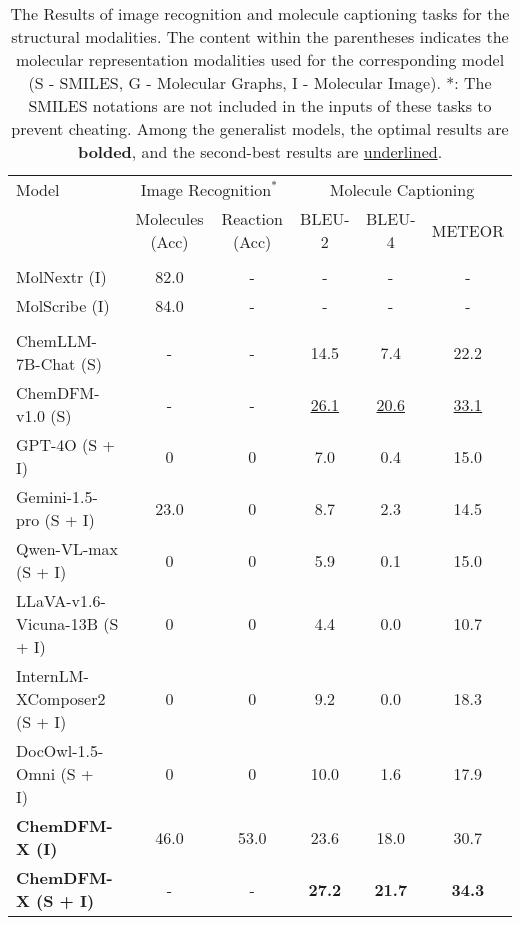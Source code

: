 \begin{table*}
    \centering
    \setlength\tabcolsep{5pt}
    \begin{tabular}{lccccc}
    \toprule
    \multirow{2.1}{*}{Model} & \multicolumn{2}{c}{$\text{Image Recognition}^*$} & \multicolumn{3}{c}{Molecule Captioning} \\
    \cmidrule(rl){2-3}  \cmidrule(rl){4-6} 
    & \small{Molecules (Acc)} & \small{Reaction (Acc)} & \small{BLEU-2} & \small{BLEU-4} & \small{METEOR} \\
    \midrule
    \rowcolor{grey}\multicolumn{6}{c}{\textit{specialist models}} \\
    MolNextr (I)~\cite{chen2024molnextr} & 82.0 & -& -& -& -\\ 
    MolScribe (I)~\cite{qian2023molscribe} & 84.0 & -& -& -& -\\
    \midrule
    \rowcolor{grey}\multicolumn{6}{c}{\textit{generalist models}} \\
    ChemLLM-7B-Chat (S)~\cite{zhang2024chemllm} & - & - & 14.5 & 7.4 & 22.2 \\
    ChemDFM-v1.0 (S)~\cite{zhao2024chemdfm} & - & - & \underline{26.1} & \underline{20.6} & \underline{33.1} \\
    GPT-4O (S + I)~\cite{gpt-4v} & 0 & 0 & 7.0 & 0.4 & 15.0 \\
    Gemini-1.5-pro (S + I)~\cite{gemini} & 23.0 & 0 & 8.7 & 2.3 & 14.5 \\
    Qwen-VL-max (S + I)~\cite{qwenvl} & 0 & 0 & 5.9 & 0.1 & 15.0 \\
    LLaVA-v1.6-Vicuna-13B (S + I)~\cite{llava} & 0 & 0 & 4.4 & 0.0 & 10.7\\
    InternLM-XComposer2 (S + I)~\cite{internlmxcomposer} & 0 & 0 & 9.2 & 0.0 & 18.3 \\
    DocOwl-1.5-Omni (S + I)~\cite{hu2024mplug} & 0 & 0 & 10.0 & 1.6 & 17.9 \\
    \multirow{1}{*}{\textbf{ChemDFM-X (I)}} & 46.0 & 53.0 & 23.6 & 18.0 & 30.7 \\
    \multirow{1}{*}{\textbf{ChemDFM-X (S + I)}} & - & - & \textbf{27.2} & \textbf{21.7} & \textbf{34.3} \\
    \bottomrule
    \end{tabular}
    \caption{The Results of image recognition and molecule captioning tasks for the structural modalities. The content within the parentheses indicates the molecular representation modalities used for the corresponding model (S - SMILES, G - Molecular Graphs, I - Molecular Image). *: The SMILES notations are not included in the inputs of these tasks to prevent cheating. 
    Among the generalist models, the optimal results are \textbf{bolded}, and the second-best results are \underline{underlined}.}
    \label{tab:image-other}
\end{table*}

